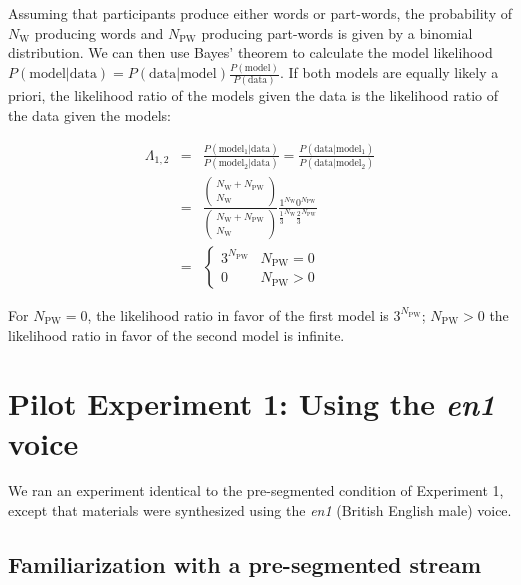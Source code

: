 \documentclass[]{article}
\newcommand{\appsection}[1]{
  \clearpage
  \section{#1}
  \setcounter{subsection}{0}%
}
\begin{document}
Assuming that participants produce either words or part-words, the probability of \(N_{\text{W}}\) producing words and \(N_{\text{PW}}\) producing part-words is given by a binomial distribution. We can then use Bayes' theorem to calculate the model likelihood \(P(\text{model|data}) = P(\text{data|model}) \frac{P(\text{model})}{P(\text{data})}\). If both models are equally likely a priori, the likelihood ratio of the models given the data is the likelihood ratio of the data given the models:

\begin{eqnarray*}
\Lambda_{1,2} & = & \frac{P(\text{model}_1 | \text{data})}{P(\text{model}_2 | \text{data})}
 = \frac{P(\text{data} | \text{model}_1 )}{P(\text{data} | \text{model}_2)} \\
 & = & \frac{\left(\begin{array}{c}
N_{\text{W}} + N_{\text{PW}}\\
N_{\text{W}}
\end{array}\right)}{\left(\begin{array}{c}
N_{\text{W}} + N_{\text{PW}}\\
N_{\text{W}}
\end{array}\right)} 
\frac{1^{N_{\text{W}}} 0^{N_{\text{PW}}}}{\frac{1}{3}^{N_{\text{W}}} \frac{2}{3}^{N_{\text{PW}}}} \\
%
& = & \left\{\begin{array}{ll}
3^{N_{\text{PW}}} & N_{\text{PW}} = 0\\
0 & N_{\text{PW}} > 0
\end{array}\right.
\end{eqnarray*}

For \(N_{\text{PW}} = 0\), the likelihood ratio in favor of the first model is \(3^{N_{\text{PW}}}\); \(N_{\text{PW}} > 0\) the likelihood ratio in favor of the second model is infinite.

\appsection{Pilot Experiment 1: Using the \emph{en1} voice}\label{app:exp_en1}

We ran an experiment identical to the pre-segmented condition of Experiment 1, except that materials were synthesized using the {\em en1} (British English male) voice. 

\subsection{Familiarization with a pre-segmented stream}\label{app:exp_en1_segm}
\end{document}
